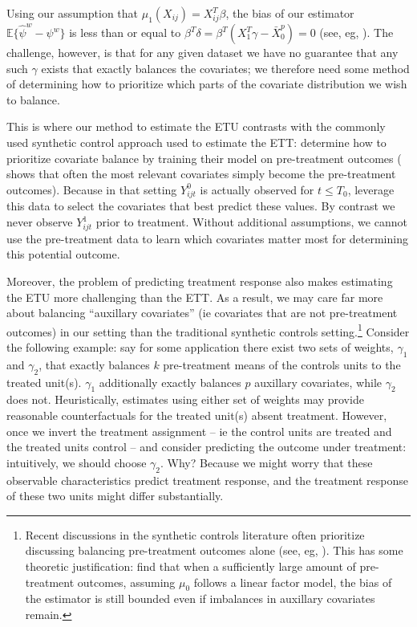 \documentclass[12pt]{article}
\begin{document}
Using our assumption that $\mu_1(X_{ij}) = X_{ij}^T\beta$, the bias of our estimator $\mathbb{E}\{\hat{\psi}^w - \psi^w\}$ is less than or equal to $\beta^T \delta = \beta^T(X_1^T\gamma - \bar{X}_0^p) = 0$ (see, eg, \cite{zubizarreta2015stable}). The challenge, however, is that for any given dataset we have no guarantee that any such $\gamma$ exists that exactly balances the covariates; we therefore need some method of determining how to prioritize which parts of the covariate distribution we wish to balance.

This is where our method to estimate the ETU contrasts with the commonly used synthetic control approach used to estimate the ETT: \cite{abadie2010synthetic} determine how to prioritize covariate balance by training their model on pre-treatment outcomes (\cite{kaul2015synthetic} shows that often the most relevant covariates simply become the pre-treatment outcomes). Because in that setting $Y^0_{ijt}$ is actually observed for $t \le T_0$, \cite{abadie2010synthetic} leverage this data to select the covariates that best predict these values. By contrast we never observe $Y^1_{ijt}$ prior to treatment. Without additional assumptions, we cannot use the pre-treatment data to learn which covariates matter most for determining this potential outcome.

Moreover, the problem of predicting treatment response also makes estimating the ETU more challenging than the ETT. As a result, we may care far more about balancing ``auxillary covariates'' (ie covariates that are not pre-treatment outcomes) in our setting than the traditional synthetic controls setting.\footnote{Recent discussions in the synthetic controls literature often prioritize discussing balancing pre-treatment outcomes alone (see, eg, \cite{doudchenko2016balancing}). This has some theoretic justification: \cite{botosaru2019role} find that when a sufficiently large amount of pre-treatment outcomes, assuming $\mu_0$ follows a linear factor model, the bias of the estimator is still bounded even if imbalances in auxillary covariates remain.} Consider the following example: say for some application there exist two sets of weights, $\gamma_1$ and $\gamma_2$, that exactly balances $k$ pre-treatment means of the controls units to the treated unit(s). $\gamma_1$ additionally exactly balances $p$ auxillary covariates, while $\gamma_2$ does not. Heuristically, estimates using either set of weights may provide reasonable counterfactuals for the treated unit(s) absent treatment. However, once we invert the treatment assignment -- ie the control units are treated and the treated units control -- and consider predicting the outcome under treatment: intuitively, we should choose $\gamma_2$. Why? Because we might worry that these observable characteristics predict treatment response, and the treatment response of these two units might differ substantially. 
\end{document}
